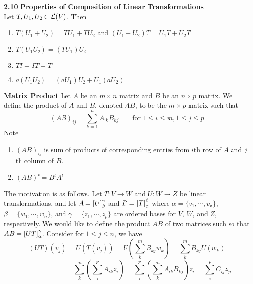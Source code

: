 \documentclass[11pt]{article}
\begin{document}
\begin{theorem*}
    \textbf{2.10 Properties of Composition of Linear Transformations} \\
    Let $T,U_1,U_2 \in \mathcal{L}(V)$. Then 
    \begin{enumerate}
        \item $T(U_1 + U_2) = TU_1 + TU_2$ and $(U_1 + U_2)T = U_1T + U_2T$
        \item $T(U_1 U_2) = (TU_1)U_2 $
        \item $TI = IT = T$ 
        \item $a(U_1 U_2) = (aU_1)U_2 + U_1 (a U_2)$
    \end{enumerate}
\end{theorem*}


\begin{defn*} \textbf{Matrix Product}
    Let $A$ be an $m \times n$ matrix and $B$ be an $n\times p$ matrix. We define the product of $A$ and $B$, denoted $AB$, to be the $m\times p$ matrix such that 
    \[
        (AB)_{ij} = \sum_{k=1}^n A_{ik} B_{kj}
        \quad \quad 
        \text{for } 1 \leq i \leq m, 1 \leq j \leq p   
    \]
    Note 
    \begin{enumerate}
        \item $(AB)_{ij}$ is sum of products of corresponding entries from $i$th row of $A$ and $j$th column of $B$.
        \item $(AB)^t = B^t A^t$
    \end{enumerate}
    \begin{rem}
        The motivation is as follows. Let $T:V\to W$ and $U:W\to Z$ be linear transformations, and let $A = \left[ U \right]_{\beta}^{\gamma}$ and $B = \left[ T \right]_{\alpha}^{\beta}$ where $\alpha = \{v_1,\cdots, v_n\}$, $\beta = \{w_1,\cdots, w_n\}$, and $\gamma=\{z_1,\cdots, z_p\}$ are ordered bases for $V$, $W$, and $Z$, respectively. We would like to define the product $AB$ of two matrices such so that $AB = \left[ UT \right]_{\alpha}^{\gamma}$. Consider for $1\leq j \leq n$, we have
        \[
            (UT)(v_j) 
            = U(T(v_j))     
            = U\left( \sum_{k}^m B_{kj}w_k \right)
            = \sum_k^m B_{kj} U(w_k) 
        \]
        \[
            \quad \quad \quad \quad \quad \quad 
            = \sum_k^m \left( \sum_i^p A_{ik}z_i \right)
            = \sum_i^p \left( \sum_k^m A_{ik} B_{kj} \right) z_i 
            = \sum_i^p C_{ij}z_p        
        \]
    \end{rem}
\end{defn*}
\end{document}
